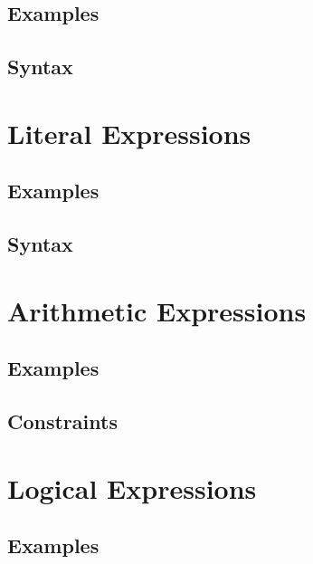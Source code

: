 \documentclass[a4paper,oneside,12pt, extrafontsizes]{memoir}
\begin{document}
    \section{Examples}
    

    \section{Syntax}
    

  \chapter{Literal Expressions}
  \label{ch:literals}
  

    \section{Examples}
    

    \section{Syntax}
    

  \chapter{Arithmetic Expressions}
  \label{ch:arithmetic}
  

    \section{Examples}
    

    \section{Constraints}
    

  \chapter{Logical Expressions}
  \label{ch:logical}
  

    \section{Examples}
    
\end{document}
